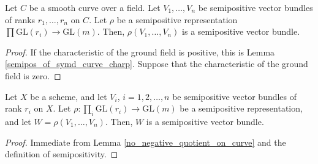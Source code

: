 \begin{lemma}\label{no_negative_quotient_on_curve}
Let $C$ be a smooth curve over a field. Let $V_1,\ldots,V_n$ be semipositive vector bundles of ranks $r_1,\ldots,r_n$ on $C$. Let $\rho$ be a semipositive representation $\prod\mathrm{GL}(r_i)\to \mathrm{GL}(m)$. Then, $\rho(V_1,\ldots,V_n)$ is a semipositive vector bundle.
\end{lemma}
\begin{proof}
If the characteristic of the ground field is positive, this is Lemma \ref{semipos_of_symd_curve_charp}. Suppose that the characteristic of the ground field is zero.
\end{proof}


\begin{lemma}\label{apply_rho_still_semipos}
Let $X$ be a scheme, and let $V_i$, $i=1,2,\ldots,n$ be semipositive vector bundles of rank $r_i$ on $X$. 
Let $\rho:\prod_i \mathrm{GL}(r_i)\to \mathrm{GL}(m)$ be a semipositive representation, and let $W=\rho(V_1,\ldots,V_n)$. 
Then, $W$ is a semipositive vector bundle.
\end{lemma}

\begin{proof}
Immediate from Lemma \ref{no_negative_quotient_on_curve} and the definition of semipositivity.
\end{proof}

